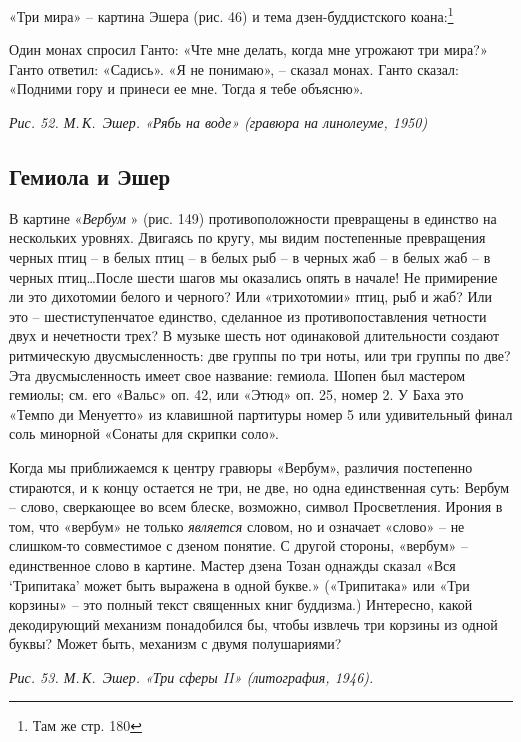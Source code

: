 \documentclass[../main.tex]{subfiles}
\begin{document}
«Три мира» \--- картина Эшера (рис. 46) и тема дзен-буддистского коана:\footnote{Там же стр. 180}

\begin{koan}
    Один монах спросил Ганто: «Чте мне делать, когда мне угрожают три мира?» Ганто ответил: «Садись». «Я не понимаю», \--- сказал монах. Ганто сказал: «Подними гору и принеси ее мне. Тогда я тебе объясню».
\end{koan}

\emph{Рис. 52. М.\,К.~Эшер. «Рябь на воде» (гравюра на линолеуме, 1950)}


\subsection{Гемиола и Эшер}

В картине «\emph{Вербум} » (рис. 149) противоположности превращены в единство на нескольких уровнях. Двигаясь по кругу, мы видим постепенные превращения черных птиц \--- в белых птиц \--- в белых рыб \--- в черных жаб \--- в белых жаб \--- в черных птиц\ldots После шести шагов мы оказались опять в начале! Не примирение ли это дихотомии белого и черного? Или «трихотомии» птиц, рыб и жаб? Или это \--- шестиступенчатое единство, сделанное из противопоставления четности двух и нечетности трех? В музыке шесть нот одинаковой длительности создают ритмическую двусмысленность: две группы по три ноты, или три группы по две? Эта двусмысленность имеет свое название: гемиола. Шопен был мастером гемиолы; см. его «Вальс» оп. 42, или «Этюд» оп. 25, номер 2. У Баха это «Темпо ди Менуетто» из клавишной партитуры номер 5 или удивительный финал соль минорной «Сонаты для скрипки соло».

Когда мы приближаемся к центру гравюры «Вербум», различия постепенно стираются, и к концу остается не три, не две, но одна единственная суть: Вербум \--- слово, сверкающее во всем блеске, возможно, символ Просветления. Ирония в том, что «вербум» не только \emph{является} словом, но и означает «слово» \--- не слишком-то совместимое с дзеном понятие. С другой стороны, «вербум» \--- единственное слово в картине. Мастер дзена Тозан однажды сказал «Вся \enquote*{Трипитака} может быть выражена в одной букве.» («Трипитака» или «Три корзины» \--- это полный текст священных книг буддизма.) Интересно, какой декодирующий механизм понадобился бы, чтобы извлечь три корзины из одной буквы? Может быть, механизм с двумя полушариями?

\emph{Рис. 53. М.\,К.~Эшер. «Три сферы II» (литография, 1946).}
\end{document}
